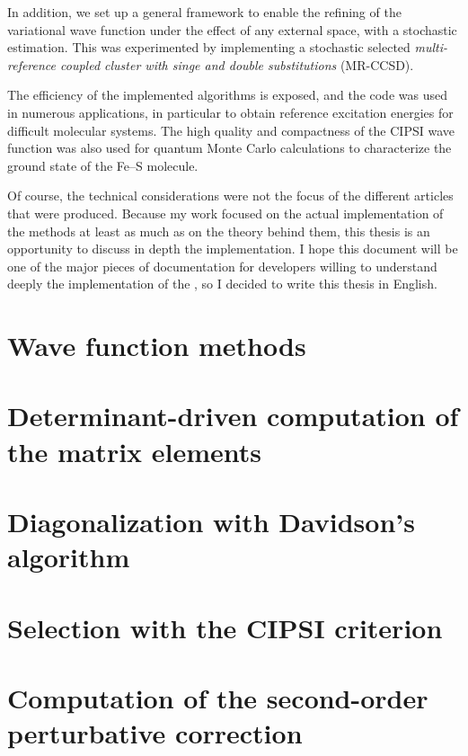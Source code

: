 \documentclass[12pt,a4paper]{report}
\begin{document}
In addition, we set up a general framework to enable the refining of the
variational wave function under the effect of any
external space, with a stochastic estimation.
This was experimented by implementing a stochastic selected \emph{multi-reference
coupled cluster with singe and double substitutions} (MR-CCSD).

The efficiency of the implemented algorithms is exposed, and the code
was used in numerous applications, in particular to obtain reference
excitation energies for difficult molecular systems. The high quality
and compactness of the CIPSI wave function was also used for quantum Monte Carlo
calculations to characterize the ground state of the Fe--S molecule.

Of course, the technical considerations were not the focus of the different
articles that were produced. Because my work focused on the actual
implementation of the methods at least as much as on the theory behind them,
this thesis is an opportunity to discuss in depth the implementation.
I hope this document will be one of the major pieces of documentation for
developers willing to understand deeply the implementation of the \QP, 
so I decided to write this thesis in English.



\chapter{Wave function methods}
\minitoc


\chapter{Determinant-driven computation of the matrix elements}
\minitoc


\chapter{Diagonalization with Davidson's algorithm}
\minitoc


\chapter{Selection with the CIPSI criterion}
\minitoc


\chapter{Computation of the second-order perturbative correction}
\minitoc

\end{document}
